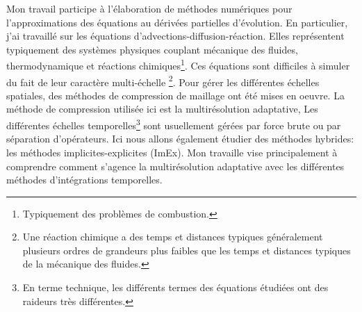 Mon travail participe à l'élaboration de méthodes numériques pour l'approximations des équations au dérivées partielles d'évolution.
En particulier, j'ai travaillé sur les équations d'advections-diffusion-réaction. Elles représentent typiquement des systèmes physiques couplant
mécanique des fluides, thermodynamique et réactions chimiques\footnote{Typiquement des problèmes de combustion.}.
Ces équations sont difficiles à simuler du fait de leur caractère multi-échelle
\footnote{Une réaction chimique a des temps et distances typiques généralement plusieurs ordres de grandeurs plus faibles que les temps et distances typiques de la mécanique des fluides.}.
Pour gérer les différentes échelles spatiales, des méthodes de compression de maillage ont été mises en oeuvre. 
La méthode de compression utilisée ici est la multirésolution adaptative, 
Les différentes échelles temporelles\footnote{En terme technique, les différents termes des équations étudiées ont des raideurs très différentes.} sont 
usuellement gérées par force brute ou par séparation d'opérateurs. Ici nous allons également étudier des méthodes hybrides: les méthodes implicites-explicites (ImEx).
Mon travaille vise principalement à comprendre comment s'agence la multirésolution adaptative avec les différentes méthodes d'intégrations temporelles.